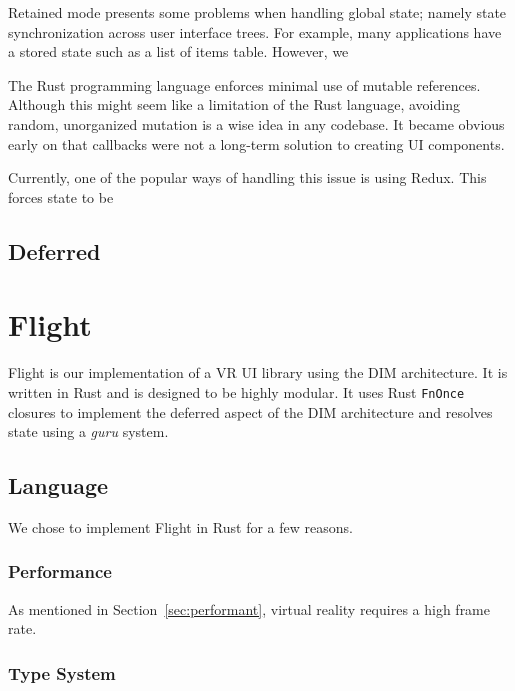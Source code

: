 \documentclass[conference,12pt]{IEEEtran}
\begin{document}
Retained mode presents some problems when handling global state; namely state
synchronization across user interface trees. For example, many applications have
a stored state such as a list of items table. However, we 

The Rust programming language enforces minimal use of mutable references.
Although this might seem like a limitation of the Rust language, avoiding
random, unorganized mutation is a wise idea in any codebase. It became obvious
early on that callbacks were not a long-term solution to creating UI components.

Currently, one of the popular ways of handling this issue is using Redux. This
forces state to be


\subsection{Deferred}

\section{Flight}\label{sec:flight}
Flight is our implementation of a VR UI library using the DIM architecture. It
is written in Rust and is designed to be highly modular. It uses Rust
\texttt{FnOnce} closures to implement the deferred aspect of the DIM
architecture and resolves state using a \textit{guru} system.

\subsection{Language}
We chose to implement Flight in Rust for a few reasons.

\subsubsection{Performance}
As mentioned in Section~\ref{sec:performant}, virtual reality requires a high
frame rate.

\subsubsection{Type System}
\end{document}
